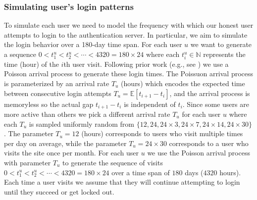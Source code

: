 \subsubsection{Simulating user's login patterns}\label{section:ExperimentDesign-subsection:SimulateUser-subsubsection:SimulateLoginPattern} %
To simulate each user we need to model the frequency with which our honest user attempts to login to the authentication server. In particular, we aim to simulate the login behavior over a 180-day time span. For each user $u$ we want to generate a sequence $0 < t_1^u < t_2^u < \cdots <  4320 = 180\times24$  where each $t_i^u \in \mathbb{N}$ represents the time (hour) of the $i$th user visit. Following prior work (e.g., see \cite{AC:BloBluDat13,CCS:KogManBon17}) we use a Poisson arrival process to generate these login times. The Poissuon arrival process is parameterized by an arrival rate $T_u$ (hours) which encodes the expected time between consecutive login attempts $T_u = \mathbb{E}[t_{i+1}-t_i]$, and the arrival process is memoryless so the actual gap $t_{i+1}-t_i$  is independent of $t_i$. Since some users are more active than others we pick a different arrival rate $T_u$ for each user $u$ where each $T_u$ is sampled uniformly random from $\{ 12, 24, 24 \times 3, 24 \times 7, 24 \times 14, 24 \times 30\}$. The parameter $T_u = 12$ (hours) corresponds to users who visit multiple times per day on average, while the parameter $T_u = 24 \times 30$ corresponds to a user who visits the site once per month. For each user $u$ we use the Poisson arrival process with parameter $T_u$ to generate the sequence of visits $0 < t_1^u < t_2^u < \cdots <  4320 = 180\times24$   over a time span of $180$ days ($4320$ hours). Each time a user visits we assume that they will continue attempting to login until they succeed or get locked out. %


